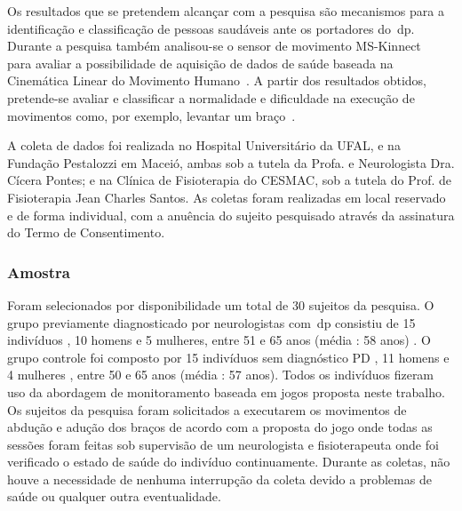 Os resultados que se pretendem alcançar com a pesquisa são mecanismos para a identificação e classificação de pessoas saudáveis ante os portadores do~\ac{dp}. Durante a pesquisa também analisou-se o sensor de movimento MS-Kinnect~\cite{kinnect2013} para avaliar a possibilidade de aquisição de dados de saúde baseada na Cinemática Linear do Movimento Humano~\cite{mcginnis2013biomechanics}. A partir dos resultados obtidos, pretende-se avaliar e classificar a normalidade e dificuldade na execução de movimentos como, por exemplo, levantar um braço~\cite{mcginnis2013biomechanics}.

A coleta de dados foi realizada no Hospital Universitário da UFAL, e na Fundação Pestalozzi em Maceió, ambas sob a tutela da Profa. e Neurologista Dra. Cícera Pontes; e na Clínica de Fisioterapia do CESMAC, sob a tutela do Prof. de Fisioterapia Jean Charles Santos. As coletas foram realizadas em local reservado e de forma individual, com a anuência do sujeito pesquisado através da assinatura do Termo de Consentimento.

\subsubsection{Amostra}
Foram selecionados por disponibilidade um total de 30 sujeitos da pesquisa. O grupo previamente diagnosticado por neurologistas com~\ac{dp} consistiu de 15 indivíduos , 10 homens e 5 mulheres, entre 51 e 65 anos (média : 58 anos) . O grupo controle foi composto por 15 indivíduos sem diagnóstico PD , 11 homens e 4 mulheres , entre 50 e 65 anos (média : 57 anos). Todos os indivíduos fizeram uso da abordagem de monitoramento baseada em jogos proposta neste trabalho. Os sujeitos da pesquisa foram solicitados a executarem os movimentos de abdução e adução dos braços de acordo com a proposta do jogo onde todas as sessões foram feitas sob supervisão de um neurologista e fisioterapeuta onde foi verificado o estado de saúde do indivíduo continuamente. Durante as coletas, não houve a necessidade de nenhuma interrupção da coleta devido a problemas de saúde ou qualquer outra eventualidade.





